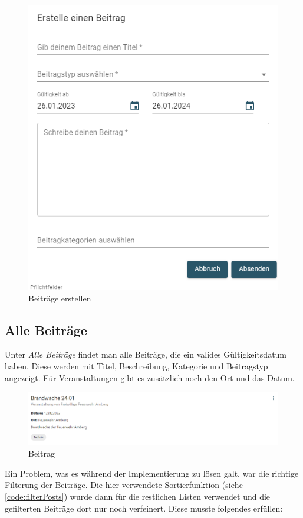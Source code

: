 \begin{figure}[ht!]
  \begin{centering}
    \includegraphics[width=.65\textwidth]{figures/implementation/createpost.png}
    \caption{Beiträge erstellen}
    \label{fig:createpost}
  \end{centering}
\end{figure}


\subsection{Alle Beiträge}
\label{sec:allposts}

Unter \textit{Alle Beiträge} findet man alle Beiträge, die ein valides Gültigkeitsdatum haben. Diese werden mit Titel, Beschreibung, Kategorie und Beitragstyp angezeigt.
Für Veranstaltungen gibt es zusätzlich noch den Ort und das Datum.

\begin{figure}[ht!]
  \begin{centering}
    \includegraphics[width=.8\textwidth]{figures/implementation/beitrag.png}
    \caption{Beitrag}
    \label{fig:beitrag}
  \end{centering}
\end{figure}

Ein Problem, was es während der Implementierung zu lösen galt, war die richtige Filterung der Beiträge. Die hier verwendete Sortierfunktion (siehe \ref{code:filterPosts}) wurde dann für die restlichen Listen verwendet und die gefilterten Beiträge dort nur noch verfeinert.
Diese musste folgendes erfüllen:

